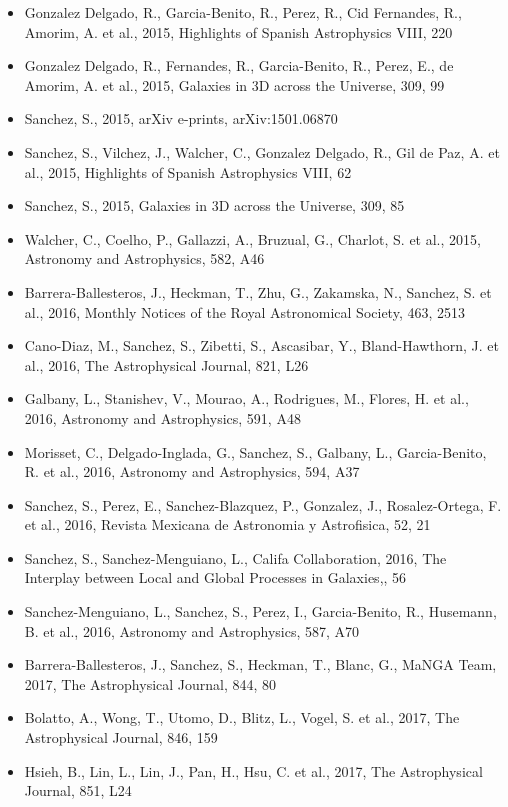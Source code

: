 \documentclass{letter}
\begin{document}
\begin{enumerate}
\begin{itemize}
\item Gonzalez Delgado, R., Garcia-Benito, R., Perez, R., Cid Fernandes, R., Amorim, A. et al., 2015, Highlights of Spanish Astrophysics VIII, 220
\item Gonzalez Delgado, R., Fernandes, R., Garcia-Benito, R., Perez, E., de Amorim, A. et al., 2015, Galaxies in 3D across the Universe, 309, 99
\item Sanchez, S., 2015, arXiv e-prints, arXiv:1501.06870
\item Sanchez, S., Vilchez, J., Walcher, C., Gonzalez Delgado, R., Gil de Paz, A. et al., 2015, Highlights of Spanish Astrophysics VIII, 62
\item Sanchez, S., 2015, Galaxies in 3D across the Universe, 309, 85
\item Walcher, C., Coelho, P., Gallazzi, A., Bruzual, G., Charlot, S. et al., 2015, Astronomy and Astrophysics, 582, A46
\item Barrera-Ballesteros, J., Heckman, T., Zhu, G., Zakamska, N., Sanchez, S. et al., 2016, Monthly Notices of the Royal Astronomical Society, 463, 2513
\item Cano-Diaz, M., Sanchez, S., Zibetti, S., Ascasibar, Y., Bland-Hawthorn, J. et al., 2016, The Astrophysical Journal, 821, L26
\item Galbany, L., Stanishev, V., Mourao, A., Rodrigues, M., Flores, H. et al., 2016, Astronomy and Astrophysics, 591, A48
\item Morisset, C., Delgado-Inglada, G., Sanchez, S., Galbany, L., Garcia-Benito, R. et al., 2016, Astronomy and Astrophysics, 594, A37
\item Sanchez, S., Perez, E., Sanchez-Blazquez, P., Gonzalez, J., Rosalez-Ortega, F. et al., 2016, Revista Mexicana de Astronomia y Astrofisica, 52, 21
\item Sanchez, S., Sanchez-Menguiano, L., Califa Collaboration, 2016, The Interplay between Local and Global Processes in Galaxies,, 56
\item Sanchez-Menguiano, L., Sanchez, S., Perez, I., Garcia-Benito, R., Husemann, B. et al., 2016, Astronomy and Astrophysics, 587, A70
\item Barrera-Ballesteros, J., Sanchez, S., Heckman, T., Blanc, G., MaNGA Team, 2017, The Astrophysical Journal, 844, 80
\item Bolatto, A., Wong, T., Utomo, D., Blitz, L., Vogel, S. et al., 2017, The Astrophysical Journal, 846, 159
\item Hsieh, B., Lin, L., Lin, J., Pan, H., Hsu, C. et al., 2017, The Astrophysical Journal, 851, L24

\end{itemize}
\end{enumerate}
\end{document}
